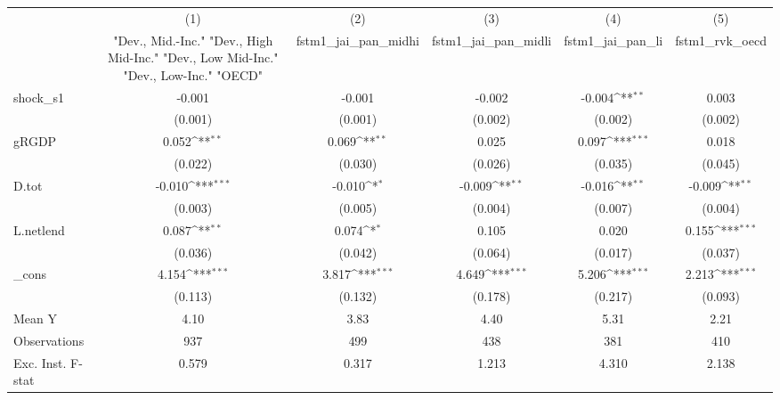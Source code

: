 {
\def\sym#1{\ifmmode^{#1}\else\(^{#1}\)\fi}
\begin{tabular}{l*{5}{c}}
\toprule
            &\multicolumn{1}{c}{(1)}&\multicolumn{1}{c}{(2)}&\multicolumn{1}{c}{(3)}&\multicolumn{1}{c}{(4)}&\multicolumn{1}{c}{(5)}\\
            &\multicolumn{1}{c}{ "Dev., Mid.-Inc." "Dev., High Mid-Inc." "Dev., Low Mid-Inc." "Dev., Low-Inc." "OECD" }&\multicolumn{1}{c}{fstm1\_jai\_pan\_midhi}&\multicolumn{1}{c}{fstm1\_jai\_pan\_midli}&\multicolumn{1}{c}{fstm1\_jai\_pan\_li}&\multicolumn{1}{c}{fstm1\_rvk\_oecd}\\
\midrule
shock\_s1    &      -0.001         &      -0.001         &      -0.002         &      -0.004\sym{**} &       0.003         \\
            &     (0.001)         &     (0.001)         &     (0.002)         &     (0.002)         &     (0.002)         \\
\addlinespace
gRGDP       &       0.052\sym{**} &       0.069\sym{**} &       0.025         &       0.097\sym{***}&       0.018         \\
            &     (0.022)         &     (0.030)         &     (0.026)         &     (0.035)         &     (0.045)         \\
\addlinespace
D.tot       &      -0.010\sym{***}&      -0.010\sym{*}  &      -0.009\sym{**} &      -0.016\sym{**} &      -0.009\sym{**} \\
            &     (0.003)         &     (0.005)         &     (0.004)         &     (0.007)         &     (0.004)         \\
\addlinespace
L.netlend   &       0.087\sym{**} &       0.074\sym{*}  &       0.105         &       0.020         &       0.155\sym{***}\\
            &     (0.036)         &     (0.042)         &     (0.064)         &     (0.017)         &     (0.037)         \\
\addlinespace
\_cons      &       4.154\sym{***}&       3.817\sym{***}&       4.649\sym{***}&       5.206\sym{***}&       2.213\sym{***}\\
            &     (0.113)         &     (0.132)         &     (0.178)         &     (0.217)         &     (0.093)         \\
\midrule
Mean Y      &        4.10         &        3.83         &        4.40         &        5.31         &        2.21         \\
Observations&         937         &         499         &         438         &         381         &         410         \\
Exc. Inst. F-stat&       0.579         &       0.317         &       1.213         &       4.310         &       2.138         \\
\bottomrule
\end{tabular}
}
